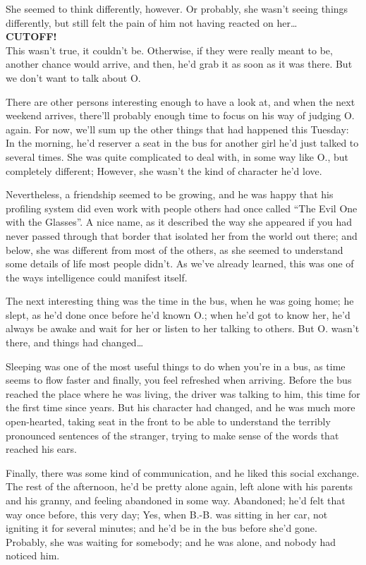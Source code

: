 She seemed to think differently, however. 
Or probably, she wasn't seeing things differently, but still felt the pain of him not having reacted on her\dots{}\\
\textbf{CUTOFF!}\\
This wasn't true, it couldn't be. Otherwise, if they were really meant to be, another chance would arrive, and then, he'd grab it as soon as it was there. 
But we don't want to talk about O.

There are other persons interesting enough to have a look at, and when the next weekend arrives, there'll probably enough time to focus on his way of judging O. again. 
For now, we'll sum up the other things that had happened this Tuesday: In the morning, he'd reserver a seat in the bus for another girl he'd just talked to several times. She was quite complicated to deal with, in some way like O., but completely different; However, she wasn't the kind of character he'd love.

Nevertheless, a friendship seemed to be growing, and he was happy that his profiling system did even work with people others had once called \enquote{The Evil One with the Glasses}. 
A nice name, as it described the way she appeared if you had never passed through that border that isolated her from the world out there; and below, she was different from most of the others, as she seemed to understand some details of life most people didn't. As we've already learned, this was one of the ways intelligence could manifest itself.

The next interesting thing was the time in the bus, when he was going home; he slept, as he'd done once before he'd known O.; when he'd got to know her, he'd always be awake and wait for her or listen to her talking to others. But O. wasn't there, and things had changed\dots{}

Sleeping was one of the most useful things to do when you're in a bus, as time seems to flow faster and finally, you feel refreshed when arriving. 
Before the bus reached the place where he was living, the driver was talking to him, this time for the first time since years. 
But his character had changed, and he was much more open-hearted, taking seat in the front to be able to understand the terribly pronounced sentences of the stranger, trying to make sense of the words that reached his ears.

Finally, there was some kind of communication, and he liked this social exchange. 
The rest of the afternoon, he'd be pretty alone again, left alone with his parents and his granny, and feeling abandoned in some way. 
Abandoned; he'd felt that way once before, this very day; Yes, when B.-B. was sitting in her car, not igniting it for several minutes; and he'd be in the bus before she'd gone. Probably, she was waiting for somebody; and he was alone, and nobody had noticed him.

